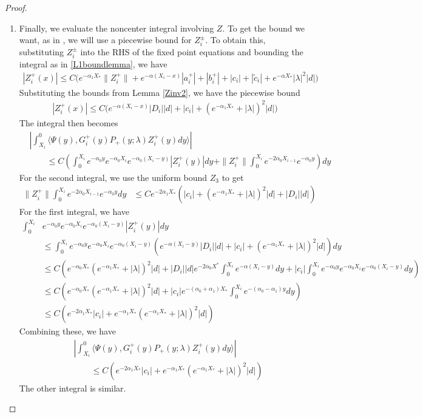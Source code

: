 \documentclass[thesis.tex]{subfiles}
\begin{document}
\begin{lemma}
\begin{proof}
\begin{enumerate}
\item Finally, we evaluate the noncenter integral involving $Z$. To get the bound we want, as in \cite{Sandstede1998}, we will use a piecewise bound for $Z_i^\pm$. To obtain this, substituting $Z_i^\pm$ into the RHS of the fixed point equations and bounding the integral as in \cref{L1boundlemma}, we have
\begin{align*}
|Z_i^+(x)| \leq C \Big( e^{-\alpha_1 X_*} \| Z_i^+\| + e^{-\alpha(X_i - x)}|a_i^+| + |b_i^+| + |c_i| + |\tilde{c}_i| + e^{-\alpha X_*}|\lambda|^2 |d| \Big)
\end{align*}
Substituting the bounds from Lemma \ref{Zinv2}, we have the piecewise bound
\begin{align*}
|Z_i^+(x)| \leq C \Big( e^{-\alpha(X_i - x)}|D_i||d| + |c_i| + (e^{-\alpha_1 X_*} + |\lambda|)^2 |d| \Big)
\end{align*}
The integral then becomes
\begin{align*}
&\left| \int_{X_i}^0 \langle \Psi(y), G_i^+(y) P_+(y; \lambda) Z_i^+(y) dy \rangle \right| \\
&\qquad \leq C \left( \int_0^{X_i} e^{-\alpha_0 y} e^{-\alpha_0 X_i} e^{-\alpha_0(X_i - y)}|Z_i^+(y)|dy + \| Z_i^+\|  \int_0^{X_i} e^{-2 \alpha_0 X_{i-1}} e^{-\alpha_0 y} \right) dy
\end{align*}
For the second integral, we use the uniform bound $Z_3$ to get 
\begin{align*}
\| Z_i^+\| \int_0^{X_i} e^{-2 \alpha_0 X_{i-1}} e^{-\alpha_0 y} dy &\leq C e^{-2 \alpha_1 X_* }\left( |c_i| + (e^{-\alpha_1 X_*} + |\lambda|)^2 |d| + |D_i||d| \right)
\end{align*}
For the first integral, we have
\begin{align*}
\int_0^{X_i} &e^{-\alpha_0 y} e^{-\alpha_0 X_i} e^{-\alpha_0(X_i - y)}|Z_i^+(y)|dy \\
&\leq \int_0^{X_i} e^{-\alpha_0 y} e^{-\alpha_0 X_i} e^{-\alpha_0(X_i - y)}\left(  e^{-\alpha(X_i - y)}|D_i||d| + |c_i| + (e^{-\alpha_1 X_*} + |\lambda|)^2 |d| \right) dy \\
&\leq C\left( e^{-\alpha_0 X_* }(e^{-\alpha_1 X_*} + |\lambda|)^2 |d| + |D_i||d| e^{-2 \alpha_0 X^*} \int_0^{X_i} e^{-\alpha(X_i - y)} dy +  |c_i| \int_0^{X_i} e^{-\alpha_0 y} e^{-\alpha_0 X_i} e^{-\alpha_0(X_i - y)} dy \right) \\
&\leq C\left( e^{-\alpha_0 X_* }(e^{-\alpha_1 X_*} + |\lambda|)^2 |d| + |c_i| e^{-(\alpha_0 + \alpha_1) X_* } \int_0^{X_i} e^{-(\alpha_0 - \alpha_1) y} dy  \right) \\
&\leq C\left( e^{-2 \alpha_1 X_* } |c_i| + e^{-\alpha_1 X_* }(e^{-\alpha_1 X_*} + |\lambda|)^2 |d| \right)
\end{align*}
Combining these, we have
\begin{align*}
&\left| \int_{X_i}^0 \langle \Psi(y), G_i^+(y) P_+(y; \lambda) Z_i^+(y) dy \rangle \right| \\
&\qquad \leq C \left( e^{-2 \alpha_1 X_* } |c_i| + e^{-\alpha_1 X_* }(e^{-\alpha_1 X_*} + |\lambda|)^2 |d| \right)
\end{align*}
The other integral is similar.
\end{enumerate}


\end{proof}
\end{lemma}
\end{document}
